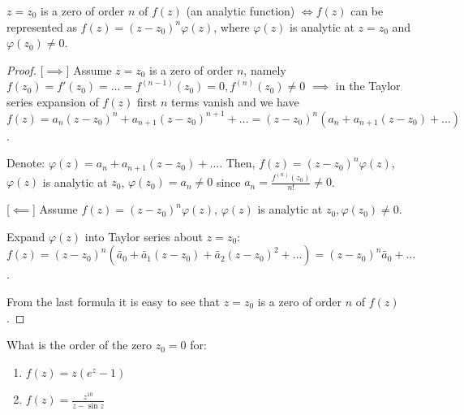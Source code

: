 \begin{proposition}\label{proposition:16.3}
    $z = z_0$ is a zero of order $n$ of $f(z)$ (an analytic function) $\iff f(z)$ can be represented as $f(z) = (z-z_0)^n \varphi(z)$, where $\varphi(z)$ is analytic at $z = z_0$ and $\varphi(z_0) \neq 0$.
\end{proposition}
\begin{proof}

     [$\implies$] Assume $z = z_0$ is a zero of order $n$, namely $f(z_0) = f'(z_0) = \dots = f^{(n-1)}(z_0) = 0, f^{(n)}(z_0) \neq 0$
    $\implies$ in the Taylor series expansion of $f(z)$ first $n$ terms vanish
    and we have $f(z) = a_n(z-z_0)^n + a_{n+1}(z-z_0)^{n+1} + \dots = (z-z_0)^n (a_n + a_{n+1}(z-z_0) + \dots)$.
    
    Denote: $\varphi(z) = a_n + a_{n+1}(z-z_0) + \dots$. Then, $f(z) = (z-z_0)^n \varphi(z)$, $\varphi(z)$ is analytic at $z_0$, $\varphi(z_0) = a_n \neq 0$ since $a_n = \frac{f^{(n)}(z_0)}{n!} \neq 0$.
    
    [$\impliedby$] Assume $f(z) = (z-z_0)^n \varphi(z)$, $\varphi(z)$ is analytic at $z_0, \varphi(z_0) \neq 0$.
    
    Expand $\varphi(z)$ into Taylor series about $z = z_0$: $f(z) = (z-z_0)^n (\tilde{a_0} + \tilde{a_1}(z-z_0) + \tilde{a_2}(z-z_0)^2 + \dots) = (z-z_0)^n \tilde{a_0} + \dots$.
    
    From the last formula it is easy to see that $z = z_0$ is a zero of order $n$ of $f(z)$.
    \end{proof}

\begin{example}\label{example:18.9} What is the order of the zero $z_0 = 0$ for:
    \begin{enumerate}
       \item  $f(z) = z(e^z - 1)$
       \item  $f(z) = \frac{z^{10}}{z - \sin z}$
    \end{enumerate}
\end{example}

